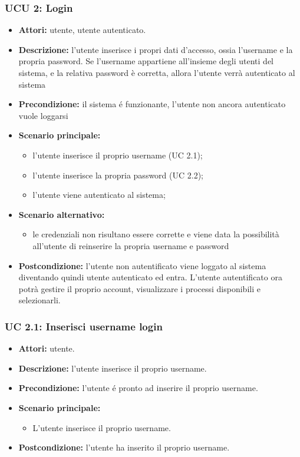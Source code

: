 \subsubsection{UCU 2: Login}
\begin{itemize}
\item \textbf{Attori: }utente, utente autenticato.
\item \textbf{Descrizione: } l'utente inserisce i propri dati d'accesso, ossia l'username e la propria password. Se l'username appartiene all'insieme degli utenti del  sistema, e la relativa password è corretta, allora l'utente verrà autenticato al sistema
\item \textbf{Precondizione:} il sistema é funzionante, l'utente non ancora autenticato vuole loggarsi
\item \textbf{Scenario principale:}
\begin{itemize}
\item l'utente inserisce il proprio username (UC 2.1);
\item l'utente inserisce la propria password (UC 2.2);
\item l'utente viene autenticato al sistema;
\end{itemize}
\item \textbf{Scenario alternativo:}
\begin{itemize}
\item le credenziali non risultano essere corrette e viene data la possibilità all'utente di reinserire la propria username e password
\end{itemize}
\item \textbf{Postcondizione:} l'utente non autentificato viene loggato al sistema diventando quindi utente autenticato ed entra. L'utente autentificato ora potrà gestire il proprio account, visualizzare i processi disponibili e selezionarli.
\end{itemize}

\subsubsection{UC 2.1: Inserisci username login}
\begin{itemize}
\item \textbf{Attori: } utente.
\item \textbf{Descrizione: } l'utente inserisce il proprio username.
\item \textbf{Precondizione:} l'utente é pronto ad inserire il proprio username.
\item \textbf{Scenario principale:}
\begin{itemize}
\item L'utente inserisce il proprio username.
\end{itemize}
\item \textbf{Postcondizione:} l'utente ha inserito il proprio username.
\end{itemize}

